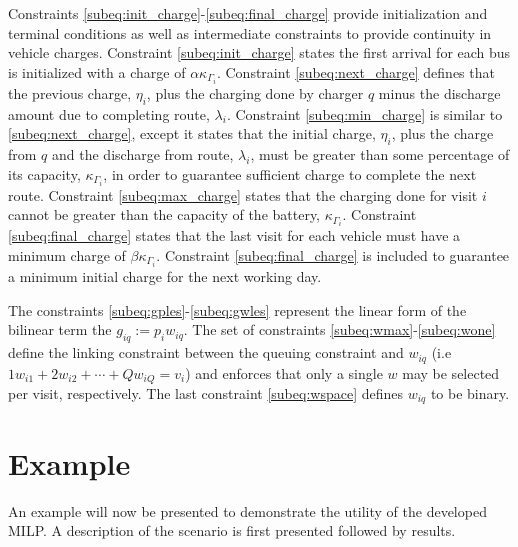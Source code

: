 \documentclass[letterpaper, 10pt, conference]{IEEEtran}
\begin{document}
Constraints \eqref{subeq:init_charge}-\eqref{subeq:final_charge} provide initialization and terminal conditions as well as intermediate constraints to provide continuity in vehicle charges. Constraint \eqref{subeq:init_charge} states the first arrival for each bus is initialized with a charge of \(\alpha \kappa_{\Gamma_i}\). Constraint \eqref{subeq:next_charge} defines that the previous charge, \(\eta_i\), plus the charging done by charger \(q\) minus the discharge amount due to completing route, \(\lambda_i\). Constraint \eqref{subeq:min_charge} is similar to \eqref{subeq:next_charge}, except it states that the initial charge, \(\eta_i\), plus the charge from \(q\) and the discharge from route, \(\lambda_i\), must be greater than some percentage of its capacity, \(\kappa_{\Gamma_i}\), in order to guarantee sufficient charge to complete the next route. Constraint \eqref{subeq:max_charge} states that the charging done for visit \(i\) cannot be greater than the capacity of the battery, \(\kappa_{\Gamma_i}\). Constraint \eqref{subeq:final_charge} states that the last visit for each vehicle must have a minimum charge of \(\beta \kappa_{\Gamma_i}\). Constraint \eqref{subeq:final_charge} is included to guarantee a minimum initial charge for the next working day.

The constraints \eqref{subeq:gples}-\eqref{subeq:gwles} represent the linear form of the bilinear term the \(g_{iq} := p_i w_{iq}\). The set of constraints \eqref{subeq:wmax}-\eqref{subeq:wone} define the linking constraint between the queuing constraint and \(w_{iq}\) (i.e \(1w_{i1} + 2w_{i2} + \cdots + Qw_{iQ} = v_i\)) and enforces that only a single \(w\) may be selected per visit, respectively. The last constraint \eqref{subeq:wspace} defines \(w_{iq}\) to be binary.

\section{Example}
\label{sec:example}

An example will now be presented to demonstrate the utility of the developed MILP. A description of the scenario is first presented followed by results.
\end{document}
